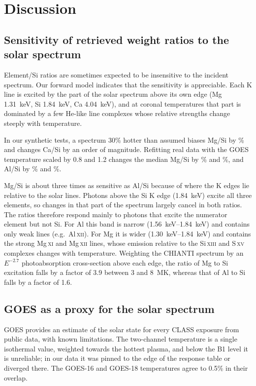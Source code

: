 \section{Discussion}\label{sec:discussion}

\subsection{Sensitivity of retrieved weight ratios to the solar spectrum}\label{sec:solar_sens}
Element/Si ratios are sometimes expected to be insensitive to the incident spectrum. Our forward model indicates that the sensitivity is appreciable. Each K line is excited by the part of the solar spectrum above its own edge (Mg \SI{1.31}{keV}, Si \SI{1.84}{keV}, Ca \SI{4.04}{keV}), and at coronal temperatures that part is dominated by a few He-like line complexes whose relative strengths change steeply with temperature.

In our synthetic tests, a spectrum 30\% hotter than assumed biases Mg/Si by \SynHotMg\% and changes Ca/Si by an order of magnitude. Refitting real data with the GOES temperature scaled by 0.8 and 1.2 changes the median Mg/Si by \TsensMgLo\% and \TsensMgHi\%, and Al/Si by \TsensAlLo\% and \TsensAlHi\%.

Mg/Si is about three times as sensitive as Al/Si because of where the K edges lie relative to the solar lines. Photons above the Si K edge (\SI{1.84}{keV}) excite all three elements, so changes in that part of the spectrum largely cancel in both ratios. The ratios therefore respond mainly to photons that excite the numerator element but not Si. For Al this band is narrow (\SIrange{1.56}{1.84}{keV}) and contains only weak lines (e.g.\ Al\,\textsc{xii}). For Mg it is wider (\SIrange{1.30}{1.84}{keV}) and contains the strong Mg\,\textsc{xi} and Mg\,\textsc{xii} lines, whose emission relative to the Si\,\textsc{xiii} and S\,\textsc{xv} complexes changes with temperature. Weighting the CHIANTI spectrum by an $E^{-2.7}$ photoabsorption cross-section above each edge, the ratio of Mg to Si excitation falls by a factor of 3.9 between 3 and \SI{8}{MK}, whereas that of Al to Si falls by a factor of 1.6.

\subsection{GOES as a proxy for the solar spectrum}\label{sec:goes_proxy}
GOES provides an estimate of the solar state for every CLASS exposure from public data, with known limitations. The two-channel temperature is a single isothermal value, weighted towards the hottest plasma, and below the B1 level it is unreliable; in our data it was pinned to the edge of the response table or diverged there. The GOES-16 and GOES-18 temperatures agree to 0.5\% in their overlap.

